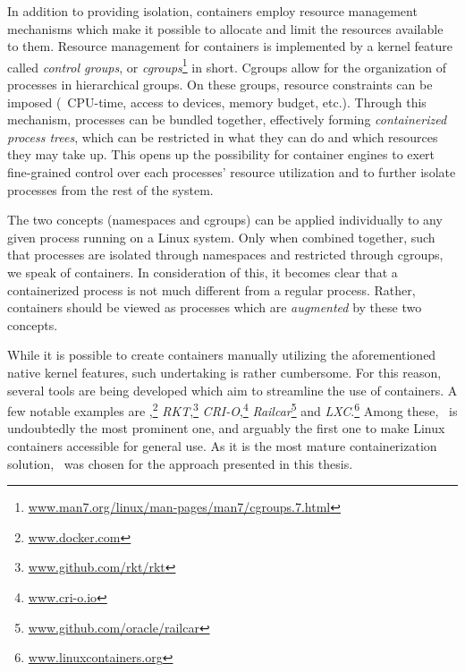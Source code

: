 In addition to providing isolation, containers employ resource management mechanisms which make it possible to allocate and limit the resources available to them. Resource management for containers is implemented by a kernel feature called \emph{control groups}, or \emph{cgroups}\footnote{\url{www.man7.org/linux/man-pages/man7/cgroups.7.html}} in short. Cgroups allow for the organization of processes in hierarchical groups. On these groups, resource constraints can be imposed (\eg\ CPU-time, access to devices, memory budget, etc.).
Through this mechanism, processes can be bundled together, effectively forming \emph{containerized process trees}, which can be restricted in what they can do and which resources they may take up. This opens up the possibility for container engines to exert fine-grained control over each processes' resource utilization and to further isolate processes from the rest of the system.

The two concepts (namespaces and cgroups) can be applied individually to any given process running on a Linux system. Only when combined together, such that processes are isolated through namespaces and restricted through cgroups, we speak of containers. In consideration of this, it becomes clear that a containerized process is not much different from a regular process. Rather, containers should be viewed as processes which are \emph{augmented} by these two concepts.


While it is possible to create containers manually utilizing the aforementioned native kernel features, such undertaking is rather cumbersome. For this reason, several tools are being developed which aim to streamline the use of containers. A few notable examples are \emph{\docker},\footnote{\url{www.docker.com}} \emph{RKT},\footnote{\url{www.github.com/rkt/rkt}} \emph{CRI-O},\footnote{\url{www.cri-o.io}} \emph{Railcar}\footnote{\url{www.github.com/oracle/railcar}} and \emph{LXC}.\footnote{\url{www.linuxcontainers.org}} Among these,  \docker\ is undoubtedly the most prominent one, and arguably the first one to make Linux containers accessible for general use. As it is the most mature containerization solution, \docker\ was chosen for the approach presented in this thesis.



